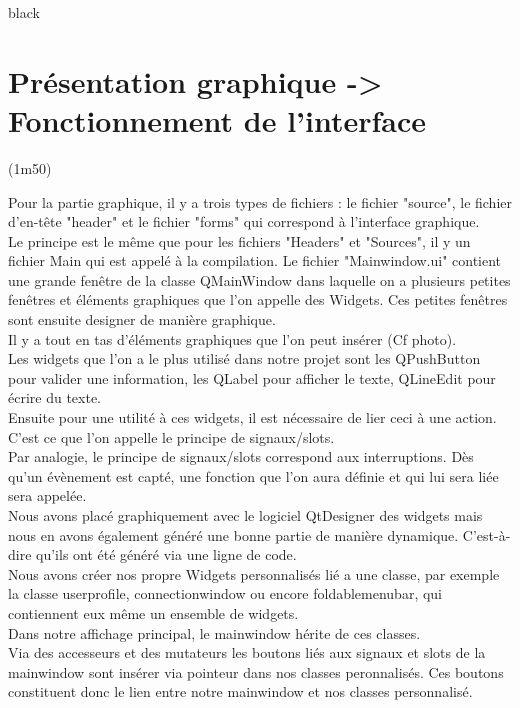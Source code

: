 \begin{items}{black}{\Bullet}
\newpage
\section{Présentation graphique -> Fonctionnement de l'interface} (1m50)

Pour la partie graphique, il y a trois types de fichiers : le fichier "source", le fichier d'en-tête "header" et le fichier "forms" qui correspond à l'interface graphique.\\

Le principe est le même que pour les fichiers "Headers" et "Sources", il y un fichier Main qui est appelé à la compilation. Le fichier "Mainwindow.ui" contient une grande fenêtre de la classe QMainWindow dans laquelle on a plusieurs petites fenêtres et éléments graphiques que l'on appelle des Widgets. Ces petites fenêtres sont ensuite designer de manière graphique. \\
Il y a tout en tas d'éléments graphiques que l'on peut insérer (Cf photo).\\
Les widgets que l'on a le plus utilisé dans notre projet sont les QPushButton pour valider une information, les QLabel pour afficher le texte, QLineEdit pour écrire du texte.\\

Ensuite pour une utilité à ces widgets, il est nécessaire de lier ceci à une action. C'est ce que l'on appelle le principe de signaux/slots.\\
Par analogie, le principe de signaux/slots correspond aux interruptions. Dès qu'un évènement est capté, une fonction que l'on aura définie et qui lui sera liée sera appelée.\\

Nous avons placé graphiquement avec le logiciel QtDesigner des widgets mais nous en avons également généré une bonne partie de manière dynamique. C'est-à-dire qu'ils ont été généré via une ligne de code.\\

Nous avons créer nos propre Widgets personnalisés lié a une classe, par exemple la classe userprofile, connectionwindow ou encore foldablemenubar, qui contiennent eux même un ensemble de widgets.\\
Dans notre affichage principal, le mainwindow hérite de ces classes.\\ 
Via des accesseurs et des mutateurs les boutons liés aux signaux et slots de la mainwindow sont insérer via pointeur dans nos classes peronnalisés. Ces boutons constituent donc le lien entre notre mainwindow et nos classes personnalisé.\\




\end{items}
